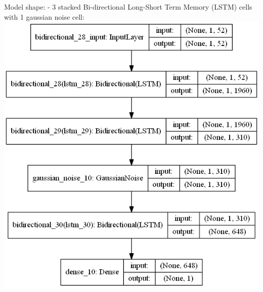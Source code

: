 \documentclass[11pt]{article}
\makeatletter
\def\maxwidth{\ifdim\Gin@nat@width>\linewidth\linewidth
    \else\Gin@nat@width\fi}
\let\Oldincludegraphics\includegraphics
\renewcommand{\includegraphics}[1]{\Oldincludegraphics[width=.8\maxwidth]{#1}}
\makeatother
\begin{document}
    Model shape: - 3 stacked Bi-directional Long-Short Term Memory (LSTM)
cells with 1 gaussian noise cell:
\includegraphics{runs/2gpuPsoDe1stationNarx1_10years/foundModels/deModelIter1.png}
\end{document}
